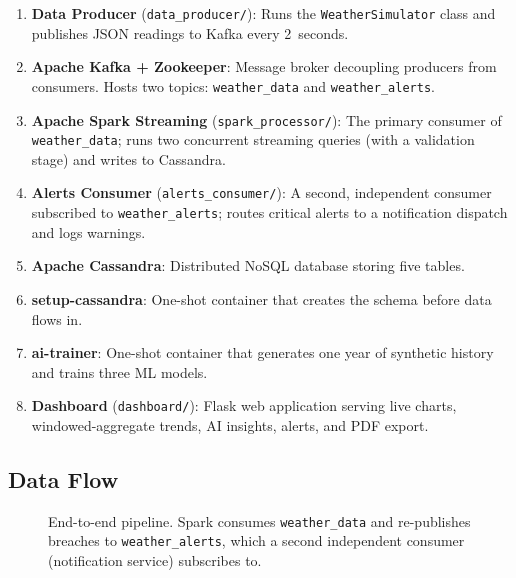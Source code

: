 \documentclass[conference,a4paper]{IEEEtran}
\begin{document}
\begin{enumerate}
  \item \textbf{Data Producer} (\texttt{data\_producer/}): Runs the \texttt{WeatherSimulator} class and publishes JSON readings to Kafka every 2~seconds.
  \item \textbf{Apache Kafka + Zookeeper}: Message broker decoupling producers from consumers. Hosts two topics: \texttt{weather\_data} and \texttt{weather\_alerts}.
  \item \textbf{Apache Spark Streaming} (\texttt{spark\_processor/}): The primary consumer of \texttt{weather\_data}; runs two concurrent streaming queries (with a validation stage) and writes to Cassandra.
  \item \textbf{Alerts Consumer} (\texttt{alerts\_consumer/}): A second, independent consumer subscribed to \texttt{weather\_alerts}; routes critical alerts to a notification dispatch and logs warnings.
  \item \textbf{Apache Cassandra}: Distributed NoSQL database storing five tables.
  \item \textbf{setup-cassandra}: One-shot container that creates the schema before data flows in.
  \item \textbf{ai-trainer}: One-shot container that generates one year of synthetic history and trains three ML models.
  \item \textbf{Dashboard} (\texttt{dashboard/}): Flask web application serving live charts, windowed-aggregate trends, AI insights, alerts, and PDF export.
\end{enumerate}

\subsection{Data Flow}

\begin{figure}[H]
\centering
{}
\caption{End-to-end pipeline. Spark consumes \texttt{weather\_data} and re-publishes breaches to \texttt{weather\_alerts}, which a second independent consumer (notification service) subscribes to.}
\label{fig:pipeline}
\end{figure}
\end{document}
